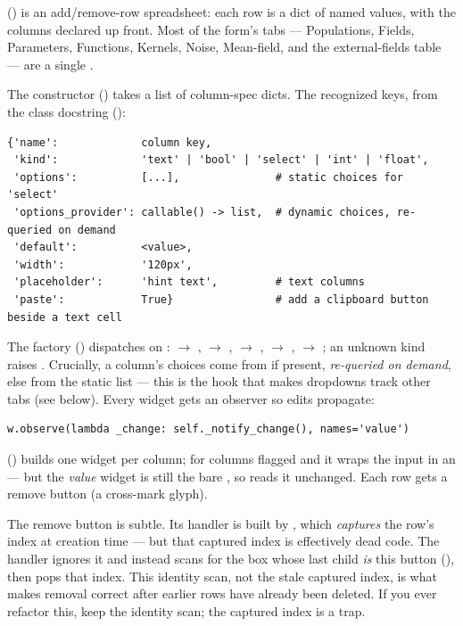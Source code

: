  () is an add/remove-row
spreadsheet: each row is a dict of named values, with the columns declared up
front. Most of the form's tabs --- Populations, Fields, Parameters, Functions,
Kernels, Noise, Mean-field, and the external-fields table --- are a single
.

The constructor  () takes a list of
column-spec dicts. The recognized keys, from the class docstring
():

\begin{lstlisting}
{'name':             column key,
 'kind':             'text' | 'bool' | 'select' | 'int' | 'float',
 'options':          [...],               # static choices for 'select'
 'options_provider': callable() -> list,  # dynamic choices, re-queried on demand
 'default':          <value>,
 'width':            '120px',
 'placeholder':      'hint text',         # text columns
 'paste':            True}                # add a clipboard button beside a text cell
\end{lstlisting}

The factory  () dispatches on
:  $\to$ ,  $\to$ ,
 $\to$ ,  $\to$ ,
 $\to$ ; an unknown kind raises .
Crucially, a  column's choices come from  if
present, \emph{re-queried on demand}, else from the static  list ---
this is the hook that makes dropdowns track other tabs (see below). Every widget
gets an observer so edits propagate:

\begin{lstlisting}
w.observe(lambda _change: self._notify_change(), names='value')
\end{lstlisting}

 () builds one widget per column;
for columns flagged  and  it wraps the input
in an  --- but the \emph{value} widget is still
the bare , so  reads it unchanged. Each row gets a
remove button (a cross-mark glyph).

\begin{gotcha}
The remove button is subtle. Its handler is built by
, which \emph{captures} the row's
index at creation time --- but that captured index is effectively dead code. The
handler ignores it and instead scans  for the box whose last
child \emph{is} this button (), then pops that
index. This identity scan, not the stale captured index, is what makes removal
correct after earlier rows have already been deleted. If you ever refactor this,
keep the identity scan; the captured index is a trap.
\end{gotcha}

